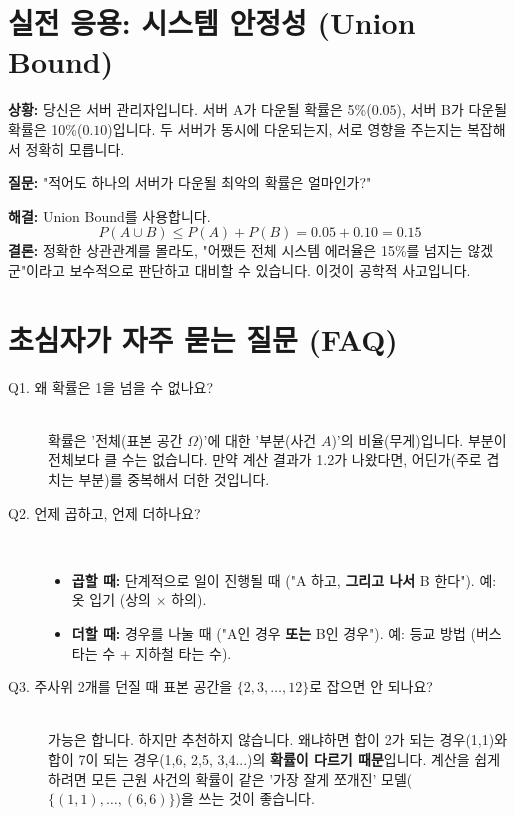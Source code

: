 \documentclass[11pt,a4paper]{book}
\theoremstyle{definition}
\begin{document}
\section{실전 응용: 시스템 안정성 (Union Bound)}

\textbf{상황:} 당신은 서버 관리자입니다. 서버 A가 다운될 확률은 5\%($0.05$), 서버 B가 다운될 확률은 10\%($0.10$)입니다. 두 서버가 동시에 다운되는지, 서로 영향을 주는지는 복잡해서 정확히 모릅니다.

\textbf{질문:} "적어도 하나의 서버가 다운될 최악의 확률은 얼마인가?"

\textbf{해결:} Union Bound를 사용합니다.
\[ P(A \cup B) \le P(A) + P(B) = 0.05 + 0.10 = 0.15 \]
\textbf{결론:} 정확한 상관관계를 몰라도, "어쨌든 전체 시스템 에러율은 15\%를 넘지는 않겠군"이라고 보수적으로 판단하고 대비할 수 있습니다. 이것이 공학적 사고입니다.

\section{초심자가 자주 묻는 질문 (FAQ)}

\begin{description}
    \item[Q1. 왜 확률은 1을 넘을 수 없나요?] \hfill \\
    확률은 '전체(표본 공간 $\Omega$)'에 대한 '부분(사건 $A$)'의 비율(무게)입니다. 부분이 전체보다 클 수는 없습니다. 만약 계산 결과가 1.2가 나왔다면, 어딘가(주로 겹치는 부분)를 중복해서 더한 것입니다.
    
    \item[Q2. 언제 곱하고, 언제 더하나요?] \hfill \\
    \begin{itemize}
        \item \textbf{곱할 때:} 단계적으로 일이 진행될 때 ("A 하고, \textbf{그리고 나서} B 한다"). 예: 옷 입기 (상의 $\times$ 하의).
        \item \textbf{더할 때:} 경우를 나눌 때 ("A인 경우 \textbf{또는} B인 경우"). 예: 등교 방법 (버스 타는 수 + 지하철 타는 수).
    \end{itemize}
    
    \item[Q3. 주사위 2개를 던질 때 표본 공간을 $\{2, 3, \dots, 12\}$로 잡으면 안 되나요?] \hfill \\
    가능은 합니다. 하지만 추천하지 않습니다. 왜냐하면 합이 2가 되는 경우(1,1)와 합이 7이 되는 경우(1,6, 2,5, 3,4...)의 \textbf{확률이 다르기 때문}입니다. 계산을 쉽게 하려면 모든 근원 사건의 확률이 같은 '가장 잘게 쪼개진' 모델($\{(1,1), \dots, (6,6)\}$)을 쓰는 것이 좋습니다.
\end{description}
\end{document}
